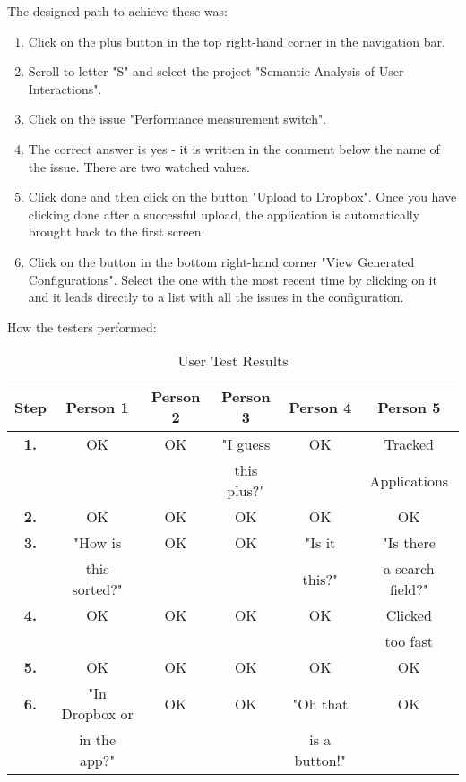 The designed path to achieve these was:

\begin{enumerate}
	\item Click on the plus button in the top right-hand corner in the navigation bar.
	\item Scroll to letter "S" and select the project "Semantic Analysis of User Interactions".
	\item Click on the issue "Performance measurement switch".
	\item The correct answer is yes - it is written in the comment below the name of the issue. There are two watched values.
	\item Click done and then click on the button "Upload to Dropbox". Once you have clicking done after a successful upload, the application is automatically brought back to the first screen.
	\item Click on the button in the bottom right-hand corner "View Generated Configurations". Select the one with the most recent time by clicking on it and it leads directly to a list with all the issues in the configuration.
\end{enumerate}

\newpage

How the testers performed:

\begin{table}[!ht]
\begin{center}
\begin{tabular}{|c|c|c|c|c|c|}
\hline
\textbf{Step} & \textbf{Person 1} & \textbf{Person 2} & \textbf{Person 3} & \textbf{Person 4} & \textbf{Person 5} \\
\hline
\textbf{1.} & OK & OK & "I guess & OK & Tracked  \\
& & & this plus?" & & Applications \\
\hline
\textbf{2.} & OK & OK & OK & OK & OK \\
\hline
\textbf{3.} & "How is  & OK & OK & "Is it & "Is there \\
& this sorted?" & & & this?" & a search field?" \\
\hline
\textbf{4.} & OK & OK & OK & OK & Clicked \\
& & & & & too fast \\
\hline
\textbf{5.} & OK & OK & OK & OK & OK \\
\hline
\textbf{6.} & "In Dropbox or & OK & OK & "Oh that & OK \\
& in the app?" & & & is a button!" & \\
\hline
\end{tabular}
\end{center}
\caption{User Test Results}
\label{tab:scenario}
\end{table}

